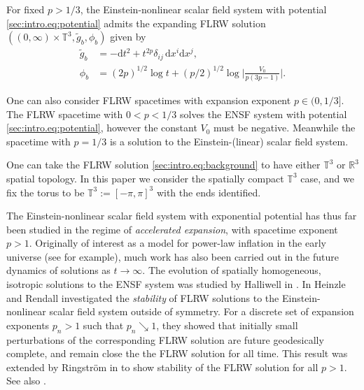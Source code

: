 \documentclass{article}
\newcommand{\RR}{\mathbb{R}}
\newcommand{\TT}{\mathbb{T}}
\newcommand{\de}{\mathrm{d}}
\newcommand{\wt}{\widetilde}
\newcommand{\ra}{\rightarrow}
\begin{document}
For fixed $p > 1/3$, the Einstein-nonlinear scalar field system with potential \eqref{sec:intro.eq:potential} admits the expanding FLRW solution $((0,\infty)\times \TT^3,\wt{g}_b,\phi_b)$ given by
\begin{subequations}\label{sec:intro.eq:background}
    \begin{align}
        \wt{g}_b &= -\de t^2 + t^{2p} \delta_{ij}\,\de x^i \de x^j,\label{sec:intro.eq:backgroundmetric}\\
        \phi_b &= (2p)^{1/2} \log t + (p/2)^{1/2}\log\Big|\frac{V_0}{p(3p-1)}\Big|.\label{sec:intro.eq:backgroundscalarfield}
    \end{align}
\end{subequations}
\begin{remark}
    One can also consider FLRW spacetimes with expansion exponent $p \in (0,1/3]$. The FLRW spacetime with $0 < p < 1/3$ solves the ENSF system with potential \eqref{sec:intro.eq:potential}, however the constant $V_0$ must be negative. Meanwhile the spacetime with $p = 1/3$ is a solution to the Einstein-(linear) scalar field system.
\end{remark}
\begin{remark}
    One can take the FLRW solution \eqref{sec:intro.eq:background} to have either $\TT^3$ or $\RR^3$ spatial topology. In this paper we consider the spatially compact $\TT^3$ case, and we fix the torus to be $\TT^3 := [-\pi,\pi]^3$ with the ends identified.
\end{remark}

The Einstein-nonlinear scalar field system with exponential potential has thus far been studied in the regime of \emph{accelerated expansion}, with spacetime exponent $p > 1$. Originally of interest as a model for power-law inflation in the early universe (see \cite{GroPetRin:quescientbigban:23} for example), much work has also been carried out in the future dynamics of solutions as $t \ra \infty$. The evolution of spatially homogeneous, isotropic solutions to the ENSF system was studied by Halliwell in \cite{Hal:ENSFFLRW:87}. In \cite{HeiRen:powerlawstab:07} Heinzle and Rendall investigated the \emph{stability} of FLRW solutions to the Einstein-nonlinear scalar field system outside of symmetry. For a discrete set of expansion exponents $p_n >1$ such that $p_n \searrow 1$, they showed that initially small perturbations of the corresponding FLRW solution are future geodesically complete, and remain close the the FLRW solution for all time. This result was extended by Ringstr\"om in \cite{Rin:powerlaw:09} to show stability of the FLRW solution for all $p > 1$. See also \cite{KitMae:cosmicnohair:92,LuoIse:powerlawmag:13,GroPetRin:quescientbigban:23}. 
\end{document}
